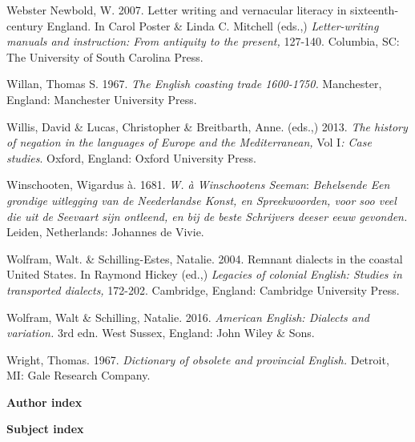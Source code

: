 \begin{styleStandard}
Webster Newbold, W. 2007. Letter writing and vernacular literacy in sixteenth-century England. In Carol Poster \& Linda C. Mitchell (eds.,) \textit{Letter-writing manuals and instruction: From antiquity to the present, }127-140. Columbia, SC: The University of South Carolina Press. 
\end{styleStandard}

\begin{styleStandard}
Willan, Thomas S. 1967. \textit{The English coasting trade 1600-1750. }Manchester, England: Manchester University Press.
\end{styleStandard}

\begin{styleStandard}
Willis, David \& Lucas, Christopher \& Breitbarth, Anne. (eds.,) 2013. \textit{The history of negation in the languages of Europe and the Mediterranean, }Vol I\textit{: Case studies}. Oxford, England: Oxford University Press. 
\end{styleStandard}

\begin{styleStandard}
Winschooten, Wigardus à. 1681. \textit{W. à Winschootens Seeman}: \textit{Behelsende Een grondige uitlegging van de Neederlandse Konst, en Spreekwoorden, voor soo veel die uit de Seevaart sijn ontleend, en bij de beste Schrijvers deeser eeuw gevonden. }Leiden, Netherlands: Johannes de Vivie. 
\end{styleStandard}

\begin{styleStandard}
Wolfram, Walt. \& Schilling-Estes, Natalie. 2004. Remnant dialects in the coastal United States. In Raymond Hickey (ed.,) \textit{Legacies of colonial English: Studies in transported dialects, }172-202. Cambridge, England: Cambridge University Press.
\end{styleStandard}

\begin{styleStandard}
Wolfram, Walt \& Schilling, Natalie. 2016. \textit{American English: Dialects and variation.} 3rd edn. West Sussex, England: John Wiley \& Sons.
\end{styleStandard}

\begin{styleStandard}
Wright, Thomas. 1967. \textit{Dictionary of obsolete and provincial English.} Detroit, MI: Gale Research Company. 
\end{styleStandard}

\clearpage\begin{styleStandard}
\textbf{Author index}
\end{styleStandard}

\clearpage\begin{styleStandard}
\textbf{Subject index}
\end{styleStandard}

